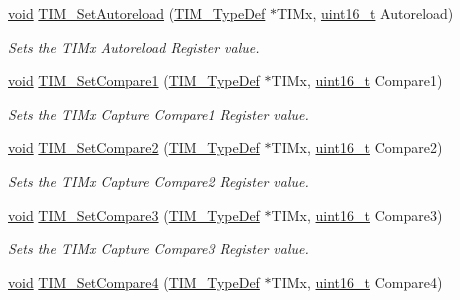 \begin{DoxyCompactItemize}
\hyperlink{usb__devapi_8h_afabf60e7f57651d6d595a02c75f07cd0}{void} \hyperlink{group___t_i_m___private___functions_ga7880e4c00002d6421f9059a2ed841d5c}{T\+I\+M\+\_\+\+Set\+Autoreload} (\hyperlink{struct_t_i_m___type_def}{T\+I\+M\+\_\+\+Type\+Def} $\ast$T\+I\+Mx, \hyperlink{_p_e___types_8h_a1f1825b69244eb3ad2c7165ddc99c956}{uint16\+\_\+t} Autoreload)
\begin{DoxyCompactList}\small\item\em Sets the T\+I\+Mx Autoreload Register value. \end{DoxyCompactList}\item 
\hyperlink{usb__devapi_8h_afabf60e7f57651d6d595a02c75f07cd0}{void} \hyperlink{group___t_i_m___private___functions_gab3a6031f187cb8af62eb09a67b4fd2ad}{T\+I\+M\+\_\+\+Set\+Compare1} (\hyperlink{struct_t_i_m___type_def}{T\+I\+M\+\_\+\+Type\+Def} $\ast$T\+I\+Mx, \hyperlink{_p_e___types_8h_a1f1825b69244eb3ad2c7165ddc99c956}{uint16\+\_\+t} Compare1)
\begin{DoxyCompactList}\small\item\em Sets the T\+I\+Mx Capture Compare1 Register value. \end{DoxyCompactList}\item 
\hyperlink{usb__devapi_8h_afabf60e7f57651d6d595a02c75f07cd0}{void} \hyperlink{group___t_i_m___private___functions_ga0175ef4fabade443909002a63d4e9758}{T\+I\+M\+\_\+\+Set\+Compare2} (\hyperlink{struct_t_i_m___type_def}{T\+I\+M\+\_\+\+Type\+Def} $\ast$T\+I\+Mx, \hyperlink{_p_e___types_8h_a1f1825b69244eb3ad2c7165ddc99c956}{uint16\+\_\+t} Compare2)
\begin{DoxyCompactList}\small\item\em Sets the T\+I\+Mx Capture Compare2 Register value. \end{DoxyCompactList}\item 
\hyperlink{usb__devapi_8h_afabf60e7f57651d6d595a02c75f07cd0}{void} \hyperlink{group___t_i_m___private___functions_ga416df50f4223351e366ae40a4ec163ae}{T\+I\+M\+\_\+\+Set\+Compare3} (\hyperlink{struct_t_i_m___type_def}{T\+I\+M\+\_\+\+Type\+Def} $\ast$T\+I\+Mx, \hyperlink{_p_e___types_8h_a1f1825b69244eb3ad2c7165ddc99c956}{uint16\+\_\+t} Compare3)
\begin{DoxyCompactList}\small\item\em Sets the T\+I\+Mx Capture Compare3 Register value. \end{DoxyCompactList}\item 
\hyperlink{usb__devapi_8h_afabf60e7f57651d6d595a02c75f07cd0}{void} \hyperlink{group___t_i_m___private___functions_gaf428edf474804691d6f587e78c97a082}{T\+I\+M\+\_\+\+Set\+Compare4} (\hyperlink{struct_t_i_m___type_def}{T\+I\+M\+\_\+\+Type\+Def} $\ast$T\+I\+Mx, \hyperlink{_p_e___types_8h_a1f1825b69244eb3ad2c7165ddc99c956}{uint16\+\_\+t} Compare4)

\end{DoxyCompactItemize}
